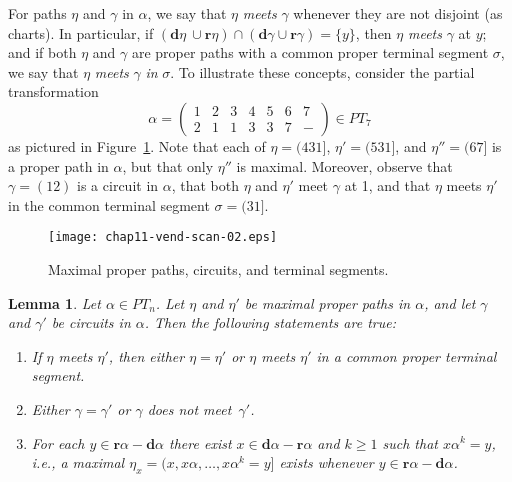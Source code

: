 \documentclass{surv-l}
\numberwithin{equation}{section}
\numberwithin{table}{section}
\numberwithin{figure}{section}
\theoremstyle{plain}
\newtheorem{lemma}[equation]{Lemma}
\theoremstyle{definition}
\begin{document}
For paths $\eta$ and $\gamma$ in $\alpha$, we say that $\eta$
\emph{meets} $\gamma$ whenever they are not disjoint (as charts).
In particular, if $(\mathbf{d}\eta\ \cup
\mathbf{r}\eta)\cap(\mathbf{d}\gamma \cup
\mathbf{r}\gamma)=\{y\}$, then $\eta$ \emph{meets} $\gamma$ at
$y$; and if both $\eta$ and $\gamma$ are proper paths with a
common proper terminal segment $\sigma$, we say that $\eta$
\emph{meets} $\gamma$ \emph{in} $\sigma$. To illustrate these
concepts, consider the partial transformation
\[
\alpha=\left(\begin{matrix}
1 & 2 & 3 & 4 & 5 & 6 & 7\\
2 & 1 & 1 & 3 & 3 & 7 & -
\end{matrix}\right)\in PT_{7}
\]
as pictured in Figure~\ref{fig11.51.1}. Note that each of
$\eta=(431]$, $\eta'=(531]$, and $\eta''=(67]$ is a proper path in
$\alpha$, but that only $\eta''$ is maximal. Moreover, observe
that $\gamma=(12)$ is a circuit in $\alpha$, that both $\eta$ and
$\eta'$ meet $\gamma$ at 1, and that $\eta$ meets $\eta'$ in the
common terminal segment $\sigma=(31]$.

\begin{figure}[!h]
\texttt{[image: chap11-vend-scan-02.eps]}
\caption{Maximal proper paths, circuits, and terminal
segments.}\label{fig11.51.1}
\end{figure}

\setcounter{equation}{1}
\begin{lemma}\label{lem11.51.2}
Let $\alpha\in PT_{n}$. Let $\eta$ and $\eta'$ be maximal proper
paths in $\alpha$, and let $\gamma$ and $\gamma'$ be circuits in
$\alpha$. Then the following statements are true:
\begin{enumerate}
\item[(1)] If $\eta$ meets $\eta'$, then either $\eta=\eta'$ or $\eta$ meets $\eta'$ in a
common proper terminal segment.

\item[(2)] Either $\gamma=\gamma'$ or $\gamma$ does not
meet~$\gamma'$.

\item[(3)] For each $y\in \mathbf{r}\alpha-\mathbf{d}\alpha$
there exist $x\in \mathbf{d}\alpha-\mathbf{r}\alpha$ and
$k\geq 1$ such that $x\alpha^{k}=y$, i.e., a maximal
$\eta_{x}=(x, x\alpha,\ldots, x\alpha^{k}=y]$ exists whenever
$y\in \mathbf{r}\alpha - \mathbf{d}\alpha$.
\end{enumerate}
\end{lemma}
\end{document}
